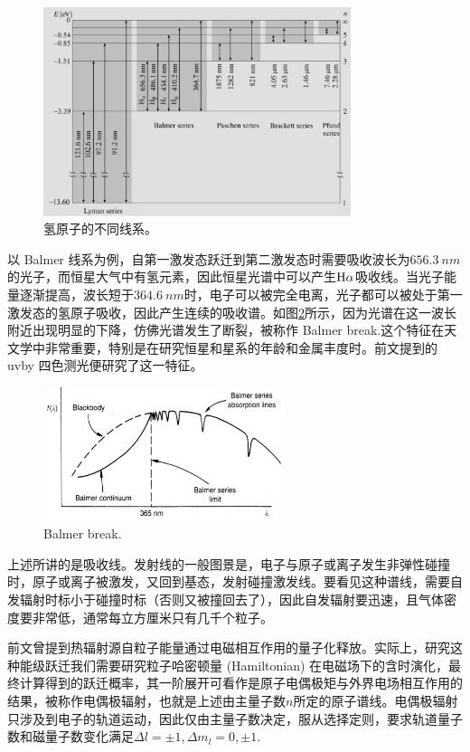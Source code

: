 \documentclass[../天体物理基础.tex]{subfiles}
\begin{document}
\begin{figure}[!htbp]
\centering
\includegraphics[width=9cm]{figures/figure1_11.png}
\captionsetup{justification=raggedright, singlelinecheck=false}
\caption{氢原子的不同线系。}
\label{氢原子的不同线系。}
\end{figure}

以 Balmer 线系为例，自第一激发态跃迁到第二激发态时需要吸收波长为$\qty{656.3}{nm}$的光子，而恒星大气中有氢元素，因此恒星光谱中可以产生$\ce{H}\alpha$吸收线。当光子能量逐渐提高，波长短于$\qty{364.6}{nm}$时，电子可以被完全电离，光子都可以被处于第一激发态的氢原子吸收，因此产生连续的吸收谱。如图\ref{Balmer break.}所示，因为光谱在这一波长附近出现明显的下降，仿佛光谱发生了断裂，被称作 Balmer break.这个特征在天文学中非常重要，特别是在研究恒星和星系的年龄和金属丰度时。前文提到的 uvby 四色测光便研究了这一特征。
\begin{figure}[!htbp]
\centering
\includegraphics[width=7cm]{figures/figure1_12.png}
\captionsetup{justification=raggedright, singlelinecheck=false}
\caption{Balmer break.}
\label{Balmer break.}
\end{figure}

上述所讲的是吸收线。发射线的一般图景是，电子与原子或离子发生非弹性碰撞时，原子或离子被激发，又回到基态，发射碰撞激发线。要看见这种谱线，需要自发辐射时标小于碰撞时标（否则又被撞回去了），因此自发辐射要迅速，且气体密度要非常低，通常每立方厘米只有几千个粒子。

前文曾提到热辐射源自粒子能量通过电磁相互作用的量子化释放。实际上，研究这种能级跃迁我们需要研究粒子哈密顿量 (Hamiltonian) 在电磁场下的含时演化，最终计算得到的跃迁概率，其一阶展开可看作是原子电偶极矩与外界电场相互作用的结果，被称作电偶极辐射，也就是上述由主量子数$n$所定的原子谱线。电偶极辐射只涉及到电子的轨道运动，因此仅由主量子数决定，服从选择定则，要求轨道量子数和磁量子数变化满足$\Delta{}l=\pm1,\Delta{}m_{l}=0,\pm1$.
\end{document}
